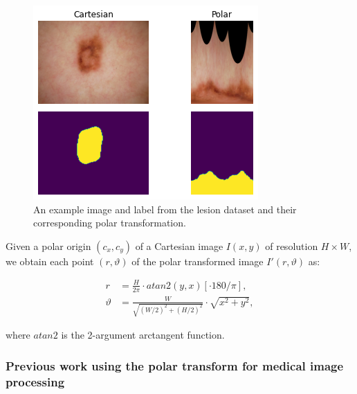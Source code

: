 \clearpage

	\begin{figure}[h]
		\centering
		\includegraphics[width=0.4\linewidth]{images/4/to_polar}
		\caption{An example image and label from the lesion dataset and their corresponding polar transformation. \cite{bencevicTrainingPolarImage2021}}
		\label{fig:polar-lesion}
	\end{figure}

Given a polar origin $(c_x, c_y)$ of a Cartesian image $I(x, y)$ of resolution $H \times W$, we obtain each point $(r, \vartheta)$ of the polar transformed image $I'(r, \vartheta)$ as:

  \begin{equation}
    \begin{aligned}
      r &= \frac{H}{2 \pi} \cdot atan2(y, x) [ \cdot 180 / \pi ], \\
      \vartheta &= \frac{W}{\sqrt{(W / 2)^2 + (H / 2)^2}} \cdot \sqrt{x^2 + y^2},
    \end{aligned}
    \label{eq:polar-transform}
  \end{equation}
  
  where $atan2$ is the 2-argument arctangent function.

    \subsubsection{Previous work using the polar transform for medical image processing}
    
